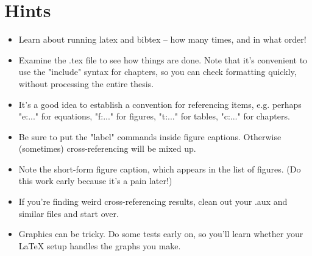 \appendix
\chapter{\label{a:hints}Hints}

\begin{itemize}


	\item Learn about running latex and bibtex -- how many times, and in what order!

 \item Examine the .tex file to see how things are done. Note that it's convenient to use the "include{}"
syntax for chapters, so you can check formatting quickly, without processing the entire thesis.

	\item It's a good idea to establish a convention for referencing items, e.g. perhaps "e:..." for
equations, "f:..." for figures, "t:..." for tables, "c:..." for chapters.


	\item Be sure to put the "label" commands inside figure captions. Otherwise (sometimes) cross-referencing will be mixed up.
	
	\item Note the short-form figure caption, which appears in the list of figures.  (Do this work early because it's a pain later!)
	
	\item If you're finding weird cross-referencing results, clean out your .aux and similar files and start over.

 	\item Graphics can be tricky. Do some tests early on, so you'll learn whether your LaTeX setup
    handles the graphs you make. 

\end{itemize}
